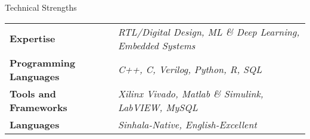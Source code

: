 \documentclass[
	11pt, %
]{./assets/resume} %
\begin{document}
	




\begin{rSection}{Technical Strengths}

	\def\arraystretch{1.5}

	\begin{tabular}{ l l}
		\textbf{Expertise} & \emph{RTL/Digital Design, ML \& Deep Learning, Embedded Systems} \\
		\textbf{Programming Languages} & \emph{C++, C, Verilog, Python, R, SQL} \\
		\textbf{Tools and Frameworks} & \emph{Xilinx Vivado, Matlab \& Simulink, LabVIEW, MySQL} \\ 
		\textbf{Languages} & \emph{Sinhala-Native, English-Excellent} \\
	\end{tabular}

\end{rSection}

\end{document}

